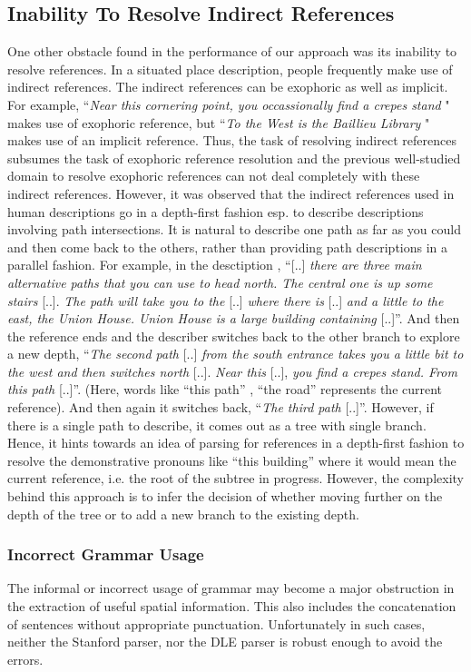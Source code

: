 \documentclass{acm_proc_article-sp}
\begin{document}
\subsection{Inability To Resolve Indirect References}
One other obstacle found in the performance of our approach was its inability to resolve references.
In a situated place description, people frequently make use of indirect references. The 
indirect references can be exophoric as well as implicit. For example, ``\textit{Near this cornering point, you occassionally find a crepes stand} "
 makes use of exophoric reference, but ``\textit{To the West is the Baillieu Library} " makes use of an implicit reference. Thus,
the task of resolving indirect references subsumes the task of exophoric reference resolution and 
the previous well-studied domain to resolve exophoric references can not deal completely with these indirect references.
However, it was observed that the indirect references used in human descriptions go in a
depth-first fashion esp. to describe descriptions involving path intersections. It is natural to
describe one path as far as you could and then come back to the others,
rather than providing path descriptions in a parallel fashion. For
example, in the desctiption , ``{[}..{]} \textit{there are three main
alternative paths that you can use to head north. The central one is up
some stairs} {[}..{]}. \textit{The path will take you to the} {[}..{]} \textit{where there
is} {[}..{]} \textit{and a little to the east, the Union House. Union House is a
large building containing} {[}..{]}''. And then the reference ends and the
describer switches back to the other branch to explore a new depth,
``\textit{The second path} {[}..{]} \textit{from the south entrance takes you a little
bit to the west and then switches north} {[}..{]}. \textit{Near this} {[}..{]},
\textit{you find a crepes stand. From this path }{[}..{]}''. (Here, words like
``this path'' , ``the road'' represents the current reference). And then
again it switches back, ``\textit{The third path} {[}..{]}''. 
However, if there is a single path to describe, it comes out as a tree with single branch.
Hence, it hints towards an idea of parsing for references in a depth-first fashion 
to resolve the demonstrative pronouns like ``this building'' where it would
mean the current reference, i.e. the root of the subtree in progress. 
However, the complexity behind this approach is to infer the decision of whether moving further on the depth
of the tree or to add a new branch to the existing depth. 

\subsubsection{Incorrect Grammar Usage}
The informal or incorrect usage of grammar may become a major obstruction in the extraction of useful spatial information. This also includes the concatenation of sentences without appropriate punctuation. Unfortunately in such cases, neither the Stanford parser, nor the DLE parser is robust enough to avoid the errors. 
\end{document}
